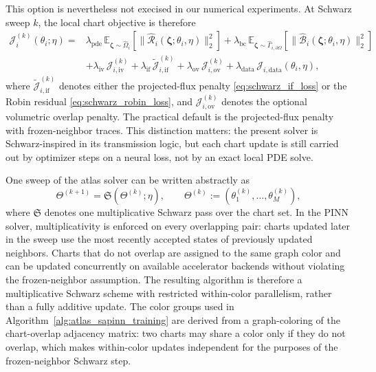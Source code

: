 \documentclass[sort&compress]{svjour3} %
\begin{document}
This option is nevertheless not execised in our numerical experiments. 
At Schwarz sweep $k$, the local chart objective is therefore
\begin{align}
\mathcal{J}_i^{(k)}(\theta_i;\eta)
=&
\lambda_{\mathrm{pde}}\,
\mathbb{E}_{\boldsymbol{\zeta}\sim \widehat{\Omega}_i}\!\left[\|\widehat{\mathcal{R}}_i(\boldsymbol{\zeta};\theta_i,\eta)\|_2^2\right]
+
\lambda_{\mathrm{bc}}\,
\mathbb{E}_{\boldsymbol{\zeta}\sim \widehat{\Gamma}_{i,\partial\Omega}}\!\left[\|\widehat{\mathcal{B}}_i(\boldsymbol{\zeta};\theta_i,\eta)\|_2^2\right]
\nonumber\\
&+
\lambda_{\mathrm{iv}}\,\mathcal{J}_{i,\mathrm{iv}}^{(k)}
+
\lambda_{\mathrm{if}}\,\widetilde{\mathcal{J}}_{i,\mathrm{if}}^{(k)}
+
\lambda_{\mathrm{ov}}\,\mathcal{J}_{i,\mathrm{ov}}^{(k)}
+
\lambda_{\mathrm{data}}\,\mathcal{J}_{i,\mathrm{data}}(\theta_i,\eta),
\label{eq:schwarz_local_loss}
\end{align}
where $\widetilde{\mathcal{J}}_{i,\mathrm{if}}^{(k)}$ denotes either the projected-flux penalty \eqref{eq:schwarz_if_loss} or the Robin residual \eqref{eq:schwarz_robin_loss}, and $\mathcal{J}_{i,\mathrm{ov}}^{(k)}$ denotes the optional volumetric overlap penalty. The practical default is the projected-flux penalty with frozen-neighbor traces. This distinction matters: the present solver is Schwarz-inspired in its transmission logic, but each chart update is still carried out by optimizer steps on a neural loss, not by an exact local PDE solve.

One sweep of the atlas solver can be written abstractly as
\begin{equation}
\Theta^{(k+1)}=\mathfrak{S}\!\left(\Theta^{(k)};\eta\right),
\qquad
\Theta^{(k)}:=(\theta_1^{(k)},\dots,\theta_M^{(k)}),
\label{eq:schwarz_sweep}
\end{equation}
where $\mathfrak{S}$ denotes one multiplicative Schwarz pass over the chart set. In the PINN solver, multiplicativity is enforced on every overlapping pair: charts updated later in the sweep use the most recently accepted states of previously updated neighbors. Charts that do not overlap are assigned to the same graph color and can be updated concurrently on available accelerator backends without violating the frozen-neighbor assumption. The resulting algorithm is therefore a multiplicative Schwarz scheme with restricted within-color parallelism, rather than a fully additive update.
The color groups used in Algorithm~\ref{alg:atlas_sapinn_training} are derived from a graph-coloring of the chart-overlap adjacency matrix: two charts may share a color only if they do not overlap, which makes within-color updates independent for the purposes of the frozen-neighbor Schwarz step.
\end{document}
